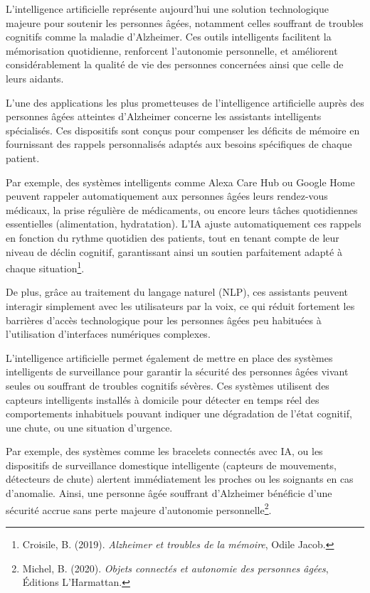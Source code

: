 \documentclass[12pt,a4paper]{report}
\begin{document}
L’intelligence artificielle représente aujourd’hui une solution technologique majeure pour soutenir les personnes âgées, notamment celles souffrant de troubles cognitifs comme la maladie d’Alzheimer. Ces outils intelligents facilitent la mémorisation quotidienne, renforcent l’autonomie personnelle, et améliorent considérablement la qualité de vie des personnes concernées ainsi que celle de leurs aidants.

L’une des applications les plus prometteuses de l’intelligence artificielle auprès des personnes âgées atteintes d’Alzheimer concerne les assistants intelligents spécialisés. Ces dispositifs sont conçus pour compenser les déficits de mémoire en fournissant des rappels personnalisés adaptés aux besoins spécifiques de chaque patient.

Par exemple, des systèmes intelligents comme Alexa Care Hub ou Google Home peuvent rappeler automatiquement aux personnes âgées leurs rendez-vous médicaux, la prise régulière de médicaments, ou encore leurs tâches quotidiennes essentielles (alimentation, hydratation). L’IA ajuste automatiquement ces rappels en fonction du rythme quotidien des patients, tout en tenant compte de leur niveau de déclin cognitif, garantissant ainsi un soutien parfaitement adapté à chaque situation\footnote{Croisile, B. (2019). \textit{Alzheimer et troubles de la mémoire}, Odile Jacob.}.

De plus, grâce au traitement du langage naturel (NLP), ces assistants peuvent interagir simplement avec les utilisateurs par la voix, ce qui réduit fortement les barrières d’accès technologique pour les personnes âgées peu habituées à l’utilisation d’interfaces numériques complexes.

L’intelligence artificielle permet également de mettre en place des systèmes intelligents de surveillance pour garantir la sécurité des personnes âgées vivant seules ou souffrant de troubles cognitifs sévères. Ces systèmes utilisent des capteurs intelligents installés à domicile pour détecter en temps réel des comportements inhabituels pouvant indiquer une dégradation de l’état cognitif, une chute, ou une situation d’urgence.

Par exemple, des systèmes comme les bracelets connectés avec IA, ou les dispositifs de surveillance domestique intelligente (capteurs de mouvements, détecteurs de chute) alertent immédiatement les proches ou les soignants en cas d’anomalie. Ainsi, une personne âgée souffrant d’Alzheimer bénéficie d’une sécurité accrue sans perte majeure d’autonomie personnelle\footnote{Michel, B. (2020). \textit{Objets connectés et autonomie des personnes âgées}, Éditions L'Harmattan.}.
\end{document}
